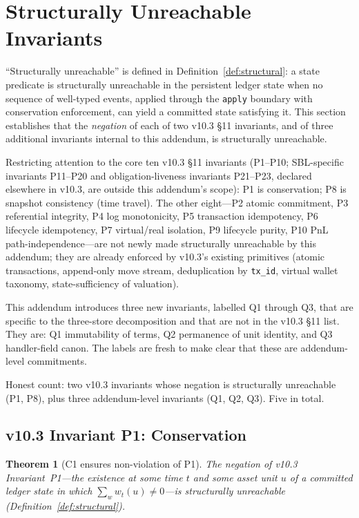 \documentclass[11pt,a4paper]{article}
\newtheorem{theorem}[definition]{Theorem}
\begin{document}
\clearpage
\section{Structurally Unreachable Invariants}
\label{sec:unreachable}

``Structurally unreachable'' is defined in Definition~\ref{def:structural}: a state predicate is structurally unreachable in the persistent ledger state when no sequence of well-typed events, applied through the \texttt{apply} boundary with conservation enforcement, can yield a committed state satisfying it. This section establishes that the \emph{negation} of each of two v10.3 \S 11 invariants, and of three additional invariants internal to this addendum, is structurally unreachable.

Restricting attention to the core ten v10.3 \S 11 invariants (P1--P10; SBL-specific invariants P11--P20 and obligation-liveness invariants P21--P23, declared elsewhere in v10.3, are outside this addendum's scope): P1 is conservation; P8 is snapshot consistency (time travel). The other eight---P2 atomic commitment, P3 referential integrity, P4 log monotonicity, P5 transaction idempotency, P6 lifecycle idempotency, P7 virtual/real isolation, P9 lifecycle purity, P10 PnL path-independence---are not newly made structurally unreachable by this addendum; they are already enforced by v10.3's existing primitives (atomic transactions, append-only move stream, deduplication by \texttt{tx\_id}, virtual wallet taxonomy, state-sufficiency of valuation).

This addendum introduces three new invariants, labelled Q1 through Q3, that are specific to the three-store decomposition and that are not in the v10.3 \S 11 list. They are: Q1 immutability of terms, Q2 permanence of unit identity, and Q3 handler-field canon. The labels are fresh to make clear that these are addendum-level commitments.

Honest count: two v10.3 invariants whose negation is structurally unreachable (P1, P8), plus three addendum-level invariants (Q1, Q2, Q3). Five in total.

\subsection{v10.3 Invariant P1: Conservation}

\begin{theorem}[C1 ensures non-violation of P1]\label{thm:conservation}
The negation of v10.3 Invariant~P1---the existence at some time $t$ and some asset unit $u$ of a committed ledger state in which $\sum_w w_t(u) \neq 0$---is structurally unreachable (Definition~\ref{def:structural}).
\end{theorem}
\end{document}
